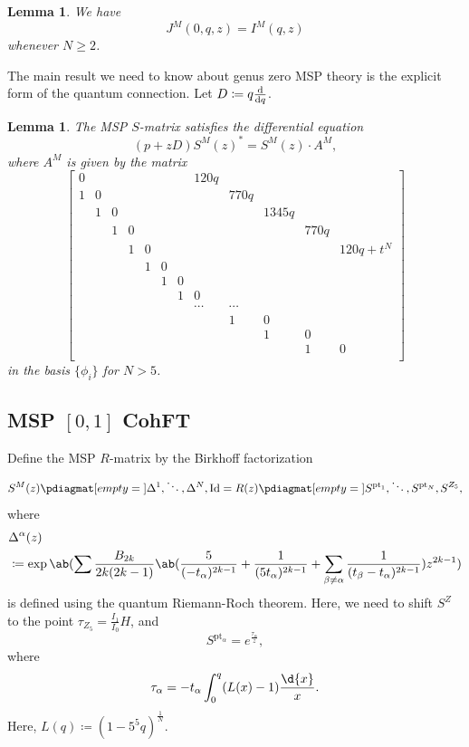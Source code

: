 \documentclass[10pt,oldfontcommands,oneside]{memoir}
\newtheorem{lem}[thm]{Lemma}
\theoremstyle{definition}
\theoremstyle{remark}
\theoremstyle{plain}
\theoremstyle{definition}
\theoremstyle{remark}
\newcommand{\mr}[1]{\mathrm{#1}}
\newcommand{\1}{\mathbf{1}}
\newcommand{\2}{\mathbf{2}}
\newcommand{\3}{\mathbf{3}}
\newcommand{\pt}{\mr{pt}}
\begin{document}
\begin{lem}
    We have
    \[ J^M(0,q,z) = I^M(q,z) \]
    whenever $N \geq 2$.
\end{lem}

The main result we need to know about genus zero MSP theory is the explicit form of the quantum connection. Let $D \coloneqq q \odv{}{q}$.
\begin{lem}
    The MSP $S$-matrix satisfies the differential equation
    \[ (p + zD)S^M(z)^* = S^M(z) \cdot A^M, \]
    where $A^M$ is given by the matrix
    \[ \begin{bmatrix}
        0 & & & & & & &  120 q \\
        1 & 0 & & & & & & & 770 q \\
        & 1 & 0 & & & & & & & 1345 q \\
        & & 1 & 0 & & & & & & & 770 q \\
        & & & 1 & 0 & & & & & & & 120 q + t^N \\
        & & & & 1 & 0 \\
        & & & & & 1 & 0 \\
        & & & & & & 1 & 0 \\
        & & & & & & & \cdots & \cdots \\
        & & & & & & & & 1 & 0 \\
        & & & & & & & & & 1 & 0 \\
        & & & & & & & & & & 1 & 0 \\
    \end{bmatrix}
    \]
    in the basis $\{ \phi_i \}$ for $N > 5$.
\end{lem}

\subsection{MSP $[0,1]$ CohFT}%
\label{sub:MSP 01 CohFT}

Define the MSP $R$-matrix by the Birkhoff factorization
\[ S^M(z) \pdiagmat[empty={}]{\Delta^1,\ddots,\Delta^N,\mr{Id}} = R(z) \pdiagmat[empty={}]{S^{\pt_1},\ddots,S^{\pt_N},S^{Z_5}}, \]
where
\begin{align*}
    &\Delta^{\alpha}(z) \\
    &\coloneqq \exp \ab(\sum \frac{B_{2k}}{2k(2k-1)} \ab(\frac{5}{(-t_{\alpha})^{2k-1}} + \frac{1}{( 5t_{\alpha} )^{2k-1}} +\sum_{\beta\neq\alpha} \frac{1}{(t_{\beta}-t_{\alpha})^{2k-1}}) z^{2k-1}) 
\end{align*}
is defined using the quantum Riemann-Roch theorem. Here, we need to shift $S^Z$ to the point $\tau_{Z_5} = \frac{I_1}{I_0} H$, and
\[ S^{\pt_{\alpha}} = e^{\frac{\tau_{\alpha}}{z}}, \]
where
\[ \tau_{\alpha} = - t_{\alpha} \int_0^q (L(x)-1) \frac{\d{x}}{x}. \]
Here, $L(q) \coloneqq (1-5^5q)^{\frac{1}{N}}$.
\end{document}
